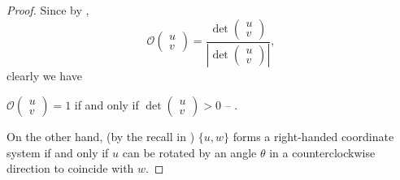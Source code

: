 \begin{proof}
Since by ,
\[
    \mathcal{O} \begin{pmatrix} u \\ v \end{pmatrix}
    = \frac
        {\det \begin{pmatrix}
            u \\ v
        \end{pmatrix}}
        {\left| \det \begin{pmatrix}
            u \\ v
        \end{pmatrix} \right|},
\]
clearly we have
\begin{center}
    \(\mathcal{O} \begin{pmatrix} u \\ v \end{pmatrix} = 1\) if and only if \(\det \begin{pmatrix} u \\ v \end{pmatrix} > 0\) -- .
\end{center}

On the other hand, (by the recall in ) \( \{u, w \}\) forms a right-handed coordinate system if and only if \(u\) can be rotated by an angle \(\theta\) in a counterclockwise direction to coincide with \(w\).


\end{proof}
